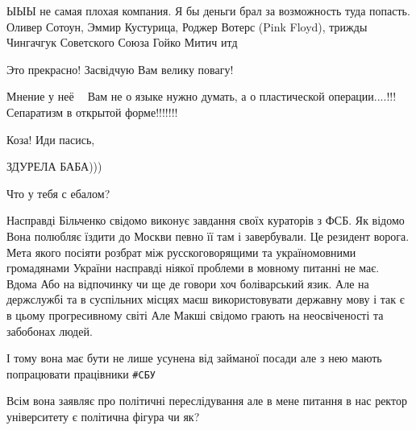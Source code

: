 \begin{itemize}
\begin{itemize}
ЫЫЫ не самая плохая компания. Я бы деньги брал за возможность туда попасть.
Оливер Сотоун, Эммир Кустурица, Роджер Вотерс (Pink Floyd), трижды Чингачгук
Советского Союза Гойко Митич итд

\end{itemize}


Это прекрасно! Засвідчую Вам велику повагу!


Мнение у неё 🙈🙈
Вам не о языке нужно думать, а о пластической операции....!!!
Сепаратизм в открытой форме!!!!!!!


Коза! Иди пасись,


ЗДУРЕЛА БАБА)))


Что у тебя с ебалом?



Насправді Більченко свідомо виконує завдання своїх кураторів з ФСБ. Як відомо
Вона полюбляє їздити до Москви певно її там і завербували. Це резидент ворога.
Мета якого посіяти розбрат між русскоговорящими та україномовними громадянами
України насправді ніякої проблеми в мовному питанні не має. Вдома Або на
відпочинку чи ще де говори хоч боліварський язик. Але на держслужбі та в
суспільних місцях маєш використовувати державну мову і так є в цьому
прогресивному світі Але Макші свідомо грають на неосвіченості та забобонах
людей.

І тому вона має бути не лише усунена від займаної посади але з нею мають
попрацювати працівники \verb|#СБУ|

Всім вона заявляє про політичні переслідування але в мене питання в нас ректор
університету є політична фігура чи як?



\end{itemize}
